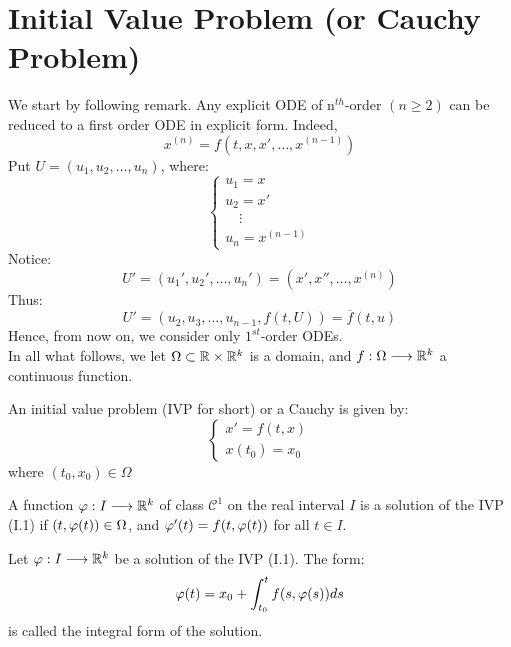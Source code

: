\section{Initial Value Problem (or Cauchy Problem)}
We start by following remark. Any explicit ODE of n$^{th} $-order $(n \geq 2)$ can be reduced 
to a first order ODE in explicit form. Indeed, 
\[
  x^{(n) }  = f(t, x, x', \hdots , x^{(n-1) }) 
\]
Put $U = (u_1, u_2, \hdots , u_{n})  $, where: 
\[
\begin{cases}
u_1 = x \\
u_2 = x' \\
\quad  \vdots \\
u_{n} = x^{(n-1) }
\end{cases}
\]
Notice:
\[
U' = (u_1', u_2', \hdots , u_{n}')  = 
(x', x'', \hdots , x^{(n) }) 
\]
Thus:
\[
U' = (u_2, u_3, \hdots , u_{n-1}, f(t, U) )  = \overline{f}(t, u) 
\]
Hence, from now on, we consider only $1^{st}$-order ODEs. \\
In all what follows, we let $\Omega \subset \mathbb{R}  \times \mathbb{R} ^{k}$ is a domain, and 
$ f : \Omega  \longrightarrow \mathbb{R} ^{k} $ a continuous function.
\begin{definition}[]
An initial value problem (IVP for short) or a Cauchy is given by: 
\[
\begin{cases}
x' = f(t, x)  \\
x(t_0) = x_0 
\end{cases}
\]
where $(t_0, x_0) \in \Omega $ 
\end{definition}
\begin{definition}[]
A function $ \varphi  : I \longrightarrow \mathbb{R} ^{k} $ of class $\mathcal{C} ^{1} $ on the real
interval $I $ is a solution of the IVP (I.1) if 
$(t, \varphi (t) )  \in  \Omega $, and $\varphi '(t) = f(t, \varphi (t) )   $ for all
$t \in  I $. 
\end{definition}
\begin{definition}[]
  Let $ \varphi  : I \longrightarrow \mathbb{R} ^{k} $ be a solution of the IVP (I.1). The form: 
  \[
    \varphi (t) =  x_0 + \int_{t_0}^{t} f(s, \varphi (s) )  ds
  \]
  is called the integral form of the solution.
\end{definition}
